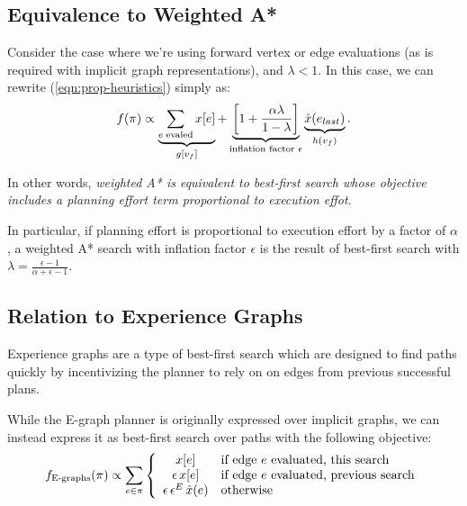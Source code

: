 \subsection{Equivalence to Weighted A*}

Consider the case where we're using forward vertex or edge evaluations
(as is required with implicit graph representations),
and $\lambda < 1$.
In this case, we can rewrite (\ref{eqn:prop-heuristics})
simply as:
\begin{equation}
   f(\pi) \propto
   \underbrace{\sum_{e \; \mbox{\scriptsize evaled}} x[e]}_{g[v_f]}
   +
   \underbrace{\left[ 1 + \frac{\alpha \lambda}{1-\lambda} \right]}_{
      \mbox{\scriptsize inflation factor } \epsilon}
   \underbrace{\hat{x}(e_{last})}_{h(v_f)}
   .
\end{equation}

In other words,
\emph{weighted A* is equivalent to
   best-first search whose objective
   includes a planning effort term
   proportional to execution effot.}

In particular, if planning effort is proportional to execution
effort by a factor of $\alpha$,
a weighted A* search with inflation factor $\epsilon$
is the result of best-first search with
$\lambda = \frac{\epsilon-1}{\alpha+\epsilon-1}$.

\subsection{Relation to Experience Graphs}
\label{sec:egraphs}

Experience graphs \cite{phillips2012egraphs}
are a type of best-first search which
are designed to find paths quickly by incentivizing the planner
to rely on on edges from previous successful plans.

While the E-graph planner is originally expressed over implicit graphs,
we can instead express it as best-first search over paths
with the following objective:
\begin{equation}
   f_{\mbox{\scriptsize E-graphs}}(\pi) \propto \sum_{e \in \pi} \left\{
   \begin{array}{cl}
      x[e] & \mbox{if edge } e \mbox{ evaluated, this search} \\
      \epsilon \, x[e] & \mbox{if edge } e \mbox{ evaluated, previous search} \\
     \epsilon \, \epsilon^E \, \hat{x}(e) & \mbox{otherwise} \\
   \end{array}
   \right.
\end{equation}

